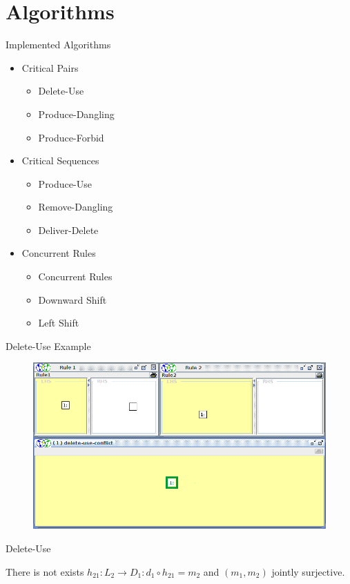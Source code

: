\documentclass[xcolor=dvipsnames,pdf,11pt,handout]{beamer}
\newcommand{\bi}{\begin{itemize}}
\newcommand{\ei}{\end{itemize}}
\newcommand{\tm}{\item}
\begin{document}
\section{Algorithms}

\begin{frame}{Implemented Algorithms}{}

\bi
\tm Critical Pairs
\bi
\tm Delete-Use
\tm Produce-Dangling
\tm Produce-Forbid
\ei
\tm Critical Sequences
\bi
\tm Produce-Use
\tm Remove-Dangling
\tm Deliver-Delete
\ei
\tm Concurrent Rules
\bi
\tm Concurrent Rules
\tm Downward Shift
\tm Left Shift
\ei
\ei

\end{frame}

\begin{frame}{Delete-Use Example}{}

\begin{figure}
\includegraphics[width=\textwidth]{du}
\end{figure}

\end{frame}

\begin{frame}[fragile]{Delete-Use}{}

\centerline{
}

\vspace{1cm}

There is not exists $h_{21}:L_2 \rightarrow D_1 : d_1 \circ h_{21} = m_2$ and $\left(m_1,m_2\right)$ jointly surjective.

\end{frame}
\end{document}
